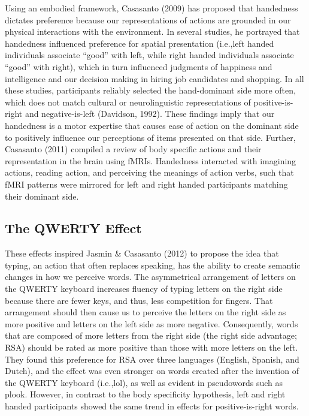\documentclass[english,man]{apa6}
\theoremstyle{definition}
\theoremstyle{definition}
\theoremstyle{definition}
\theoremstyle{remark}
\begin{document}
Using an embodied framework, Casasanto (2009) has proposed that
handedness dictates preference because our representations of actions
are grounded in our physical interactions with the environment. In
several studies, he portrayed that handedness influenced preference for
spatial presentation (i.e.,left handed individuals associate
\enquote{good} with left, while right handed individuals associate
\enquote{good} with right), which in turn influenced judgments of
happiness and intelligence and our decision making in hiring job
candidates and shopping. In all these studies, participants reliably
selected the hand-dominant side more often, which does not match
cultural or neurolinguistic representations of positive-is-right and
negative-is-left (Davidson, 1992). These findings imply that our
handedness is a motor expertise that causes ease of action on the
dominant side to positively influence our perceptions of items presented
on that side. Further, Casasanto (2011) compiled a review of body
specific actions and their representation in the brain using fMRIs.
Handedness interacted with imagining actions, reading action, and
perceiving the meanings of action verbs, such that fMRI patterns were
mirrored for left and right handed participants matching their dominant
side.

\subsection{The QWERTY Effect}\label{the-qwerty-effect}

These effects inspired Jasmin \& Casasanto (2012) to propose the idea
that typing, an action that often replaces speaking, has the ability to
create semantic changes in how we perceive words. The asymmetrical
arrangement of letters on the QWERTY keyboard increases fluency of
typing letters on the right side because there are fewer keys, and thus,
less competition for fingers. That arrangement should then cause us to
perceive the letters on the right side as more positive and letters on
the left side as more negative. Consequently, words that are composed of
more letters from the right side (the right side advantage; RSA) should
be rated as more positive than those with more letters on the left. They
found this preference for RSA over three languages (English, Spanish,
and Dutch), and the effect was even stronger on words created after the
invention of the QWERTY keyboard (i.e.,lol), as well as evident in
pseudowords such as plook. However, in contrast to the body specificity
hypothesis, left and right handed participants showed the same trend in
effects for positive-is-right words.
\end{document}
